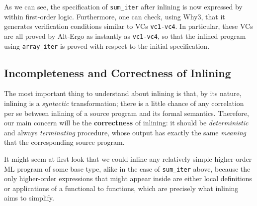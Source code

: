 \documentclass[a4paper,11pt,oneside]{article}
\theoremstyle{plain}
\begin{document}
	As we can see, the specification of \texttt{sum\_iter} after inlining is now expressed by within first-order logic.
	Furthermore, one can check, using Why3, that it generates verification conditions similar to VCs \texttt{vc1-vc4}. 
	In particular, these VCs are all proved by Alt-Ergo as instantly as \texttt{vc1-vc4}, so that the inlined program using \texttt{array\_iter} is proved with respect to the initial specification.
 
 \subsection*{Incompleteness and Correctness of Inlining}
 
The most important thing to understand about inlining is that, by its
nature, inlining is a \textit{syntactic} transformation; there is a little
chance of any correlation per se between inlining of a source program and its
formal semantics. Therefore, our main concern will be the
\textbf{correctness} of inlining: it should be \textit{deterministic} and
always \textit{terminating} procedure, whose output has exactly the
same \textit{meaning} that the corresponding source program. 
 

It might seem at first look that we could inline any relatively simple higher-order ML program of some base type, alike in the case of \texttt{sum\_iter} above, because the only higher-order expressions that might appear inside are either local definitions or applications of a functional to functions, which are precisely what inlining aims to simplify.	 


\end{document}

